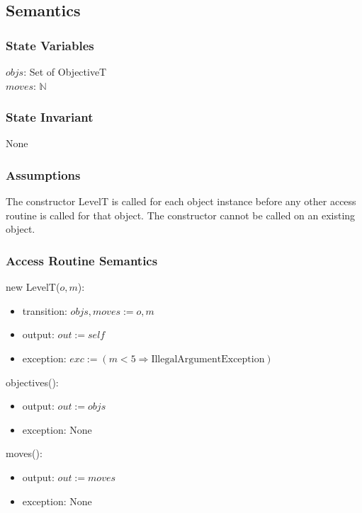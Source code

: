 \documentclass[12pt]{article}
\newcommand{\Implies}{\Rightarrow}
\begin{document}
\subsection* {Semantics}

\subsubsection* {State Variables}

$objs$: Set of ObjectiveT\\
$moves$: $\mathbb{N}$

\subsubsection* {State Invariant}

None

\subsubsection* {Assumptions}

The constructor LevelT is called for each object instance before any other
access routine is called for that object.  The constructor cannot be called on
an existing object.

\subsubsection* {Access Routine Semantics}

new LevelT($o, m$):
\begin{itemize}
	\item transition: $objs, moves := o, m$
	\item output: $out := \mathit{self}$
	\item exception: $exc := (m < 5 \Implies \mbox{IllegalArgumentException})$
\end{itemize}

\noindent objectives():
\begin{itemize}
	\item output: $out := objs$
	\item exception: None
\end{itemize}

\noindent moves():
\begin{itemize}
	\item output: $out := moves$
	\item exception: None
\end{itemize}
\end{document}
